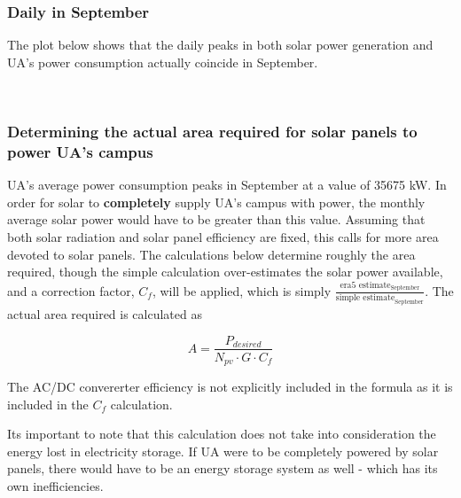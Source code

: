 \documentclass[11pt]{article}
\begin{document}
\hypertarget{daily-in-may}{%
\subsubsection{Daily in September}\label{daily-in-may}}

The plot below shows that the daily peaks in both solar power generation and UA's power consumption actually coincide in September.

\begin{center}
\end{center}
{ \hspace*{\fill} \\}
    
\hypertarget{determining-the-actual-area-required-for-solar-panels-to-power-uas-campus}{%
\subsubsection{Determining the actual area required for solar panels to
power UA's
campus}\label{determining-the-actual-area-required-for-solar-panels-to-power-uas-campus}}

\rmfamily
UA's average power consumption peaks in September at a value of 35675
kW. In order for solar to \textbf{completely} supply UA's campus with
power, the monthly average solar power would have to be greater than this
value. Assuming that both solar radiation and solar panel efficiency are
fixed, this calls for more area devoted to solar panels. The
calculations below determine roughly the area required, though the
simple calculation over-estimates the solar power available, and a
correction factor, $C_f$, will be applied, which is simply
\(\frac{\textrm{era5 estimate}_{\textrm{September}}}{\textrm{simple estimate}_{\textrm{September}}}\). The actual area required is calculated as

 \[A = \frac{P_{desired}}{N_{pv} \cdot G \cdot C_f}\]

The AC/DC convererter efficiency is not explicitly included in the formula as it is included in the $C_f$ calculation.

Its important to note that this calculation does not take into consideration the energy lost in electricity storage. If UA were to be completely powered by solar panels, there would have to be an energy storage system as well - which has its own inefficiencies.
\end{document}
